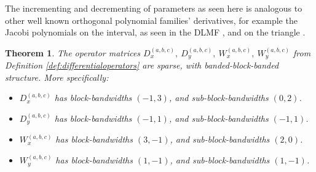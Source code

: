 \documentclass[11pt, oneside]{article}   	%
\newtheorem{theorem}{Theorem}
\begin{document}
The incrementing and decrementing of parameters as seen here is analogous to other well known orthogonal polynomial families' derivatives, for example the Jacobi polynomials on the interval, as seen in the DLMF \cite[(18.9.3)]{DLMF}, and on the triangle \cite{olver2018recurrence}.

\begin{theorem}\label{theorem:sparsityofdifferentialoperators}
The operator matrices $D_x^{(a,b,c)}, \: D_y^{(a,b,c)}, \: W_x^{(a,b,c)}, \: W_y^{(a,b,c)}$ from Definition \ref{def:differentialoperators} are sparse, with banded-block-banded structure. More specifically:
\begin{itemize}
	\item $D_x^{(a,b,c)}$ has  block-bandwidths $(-1,3)$, and sub-block-bandwidths $(0, 2)$.
  	\item $D_y^{(a,b,c)}$ has  block-bandwidths $(-1,1)$, and sub-block-bandwidths $(-1,1)$.
	\item $W_x^{(a,b,c)}$ has  block-bandwidths $(3,-1)$, and sub-block-bandwidths $(2, 0)$.
  	\item $W_y^{(a,b,c)}$ has  block-bandwidths $(1,-1)$, and sub-block-bandwidths $(1,-1)$.
\end{itemize}
\end{theorem}
\end{document}
